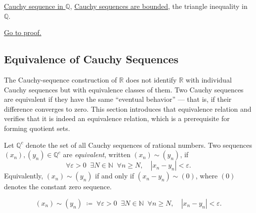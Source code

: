 \begin{remark*}[Dependencies]
\hyperref[def:cauchy-rational]{Cauchy sequence in $\mathbb{Q}$},
\hyperref[thm:cauchy-bounded-q]{Cauchy sequences are bounded},
the triangle inequality in $\mathbb{Q}$.
\end{remark*}

\begin{remark*}[Proof]
\hyperref[prf:cauchy-closed-operations-q]{Go to proof.}
\end{remark*}

\subsection{Equivalence of Cauchy Sequences}
\label{subsec:cauchy-equivalence-q}

\begin{remark}
The Cauchy-sequence construction of $\mathbb{R}$ does not identify $\mathbb{R}$
with individual Cauchy sequences but with equivalence classes of them.
Two Cauchy sequences are equivalent if they have the same ``eventual
behavior'' — that is, if their difference converges to zero.
This section introduces that equivalence relation and verifies that it
is indeed an equivalence relation, which is a prerequisite for forming
quotient sets.
\end{remark}

\begin{tcolorbox}[colback=defbox, colframe=defborder, arc=2pt,
  left=6pt, right=6pt, top=4pt, bottom=4pt,
  title={\small\textbf{Definition (Equivalence of Cauchy Sequences in $\mathbb{Q}$)}},
  fonttitle=\small\bfseries]
\begin{definition}
\label{def:cauchy-equivalence}
Let $\mathbb{Q}^c$ denote the set of all Cauchy sequences of rational numbers.
Two sequences $(x_n), (y_n) \in \mathbb{Q}^c$ are \emph{equivalent}, written
$(x_n) \sim (y_n)$, if
\[
\forall \varepsilon > 0 \;\; \exists N \in \mathbb{N} \;\; \forall n \geq N,
\quad |x_n - y_n| < \varepsilon.
\]
Equivalently, $(x_n) \sim (y_n)$ if and only if $(x_n - y_n) \sim (0)$,
where $(0)$ denotes the constant zero sequence.
\end{definition}
\end{tcolorbox}

\begin{remark*}
\[
(x_n) \sim (y_n)
\;\coloneqq\;
\forall \varepsilon > 0 \;\; \exists N \in \mathbb{N} \;\; \forall n \geq N,
\quad |x_n - y_n| < \varepsilon.
\]
\end{remark*}

